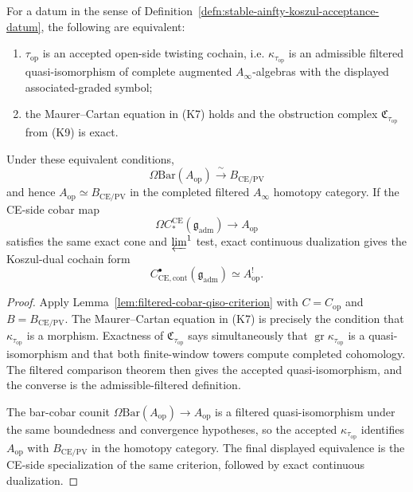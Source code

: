 \begin{thm}\label{thm:stable-ainfty-koszul-under-hypotheses}
  For a datum in the sense of
  Definition~\ref{defn:stable-ainfty-koszul-acceptance-datum}, the following
  are equivalent:
  \begin{enumerate}[label=(\alph*)]
    \item \(\tau_{\mathrm{op}}\) is an accepted open-side twisting
      cochain, i.e. \(\kappa_{\tau_{\mathrm{op}}}\) is an admissible
      filtered quasi-isomorphism of complete augmented
      \(A_\infty\)-algebras with the displayed associated-graded symbol;
    \item the Maurer--Cartan equation in (K7) holds and the obstruction
      complex \(\mathfrak C_{\tau_{\mathrm{op}}}\) from (K9) is exact.
  \end{enumerate}
  Under these equivalent conditions,
  \[
    \Omega\mathrm{Bar}(A_{\mathrm{op}})
      \xrightarrow{\ \sim\ }
    B_{\mathrm{CE/PV}}
  \]
  and hence \(A_{\mathrm{op}}\simeq B_{\mathrm{CE/PV}}\) in the
  completed filtered \(A_\infty\) homotopy category.  If the CE-side
  cobar map
  \[
    \Omega C_*^{\mathrm{CE}}(\mathfrak g_{\mathrm{adm}})
      \longrightarrow A_{\mathrm{op}}
  \]
  satisfies the same exact cone and \(\varprojlim^1\) test, exact
  continuous dualization gives the Koszul-dual cochain form
  \[
    C^\bullet_{\mathrm{CE},\mathrm{cont}}(\mathfrak g_{\mathrm{adm}})
      \simeq
    A_{\mathrm{op}}^! .
  \]
\end{thm}

\begin{proof}
  Apply Lemma~\ref{lem:filtered-cobar-qiso-criterion} with
  \(C=C_{\mathrm{op}}\) and \(B=B_{\mathrm{CE/PV}}\).  The
  Maurer--Cartan equation in (K7) is precisely the condition that
  \(\kappa_{\tau_{\mathrm{op}}}\) is a morphism.  Exactness of
  \(\mathfrak C_{\tau_{\mathrm{op}}}\) says simultaneously that
  \(\operatorname{gr}\kappa_{\tau_{\mathrm{op}}}\) is a
  quasi-isomorphism and that both finite-window towers compute completed
  cohomology.  The filtered comparison theorem then gives the accepted
  quasi-isomorphism, and the converse is the admissible-filtered
  definition.

  The bar-cobar counit
  \(\Omega\mathrm{Bar}(A_{\mathrm{op}})\to A_{\mathrm{op}}\) is a
  filtered quasi-isomorphism under the same boundedness and convergence
  hypotheses, so the accepted \(\kappa_{\tau_{\mathrm{op}}}\) identifies
  \(A_{\mathrm{op}}\) with \(B_{\mathrm{CE/PV}}\) in the homotopy
  category.  The final displayed equivalence is the CE-side specialization
  of the same criterion, followed by exact continuous dualization.
\end{proof}

